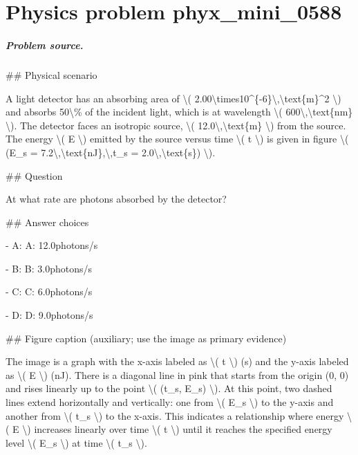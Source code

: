 
\chapter{Physics problem phyx\_mini\_0588}
\label{ch:PhyXMiniProblems_problem_phyx_mini_0588}

\paragraph{Problem source.}
\#\# Physical scenario

A light detector has an absorbing area of \textbackslash{}( 2.00\textbackslash{}times10\textasciicircum{}\{-6\}\textbackslash{},\textbackslash{}text\{m\}\textasciicircum{}2 \textbackslash{}) and absorbs 50\textbackslash{}\% of the incident light, which is at wavelength \textbackslash{}( 600\textbackslash{},\textbackslash{}text\{nm\} \textbackslash{}). The detector faces an isotropic source, \textbackslash{}( 12.0\textbackslash{},\textbackslash{}text\{m\} \textbackslash{}) from the source. The energy \textbackslash{}( E \textbackslash{}) emitted by the source versus time \textbackslash{}( t \textbackslash{}) is given in figure \textbackslash{}( (E\_s = 7.2\textbackslash{},\textbackslash{}text\{nJ\},\textbackslash{},t\_s = 2.0\textbackslash{},\textbackslash{}text\{s\}) \textbackslash{}).

\#\# Question

At what rate are photons absorbed by the detector?

\#\# Answer choices

- A: A: 12.0photons/s

- B: B: 3.0photons/s

- C: C: 6.0photons/s

- D: D: 9.0photons/s

\#\# Figure caption (auxiliary; use the image as primary evidence)

The image is a graph with the x-axis labeled as \textbackslash{}( t \textbackslash{}) (s) and the y-axis labeled as \textbackslash{}( E \textbackslash{}) (nJ). There is a diagonal line in pink that starts from the origin (0, 0) and rises linearly up to the point \textbackslash{}( (t\_s, E\_s) \textbackslash{}). At this point, two dashed lines extend horizontally and vertically: one from \textbackslash{}( E\_s \textbackslash{}) to the y-axis and another from \textbackslash{}( t\_s \textbackslash{}) to the x-axis. This indicates a relationship where energy \textbackslash{}( E \textbackslash{}) increases linearly over time \textbackslash{}( t \textbackslash{}) until it reaches the specified energy level \textbackslash{}( E\_s \textbackslash{}) at time \textbackslash{}( t\_s \textbackslash{}).

